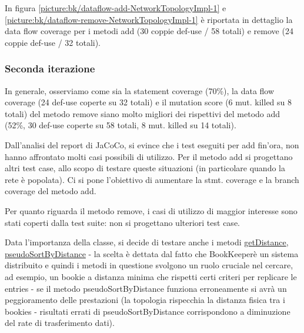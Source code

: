\documentclass[10pt, a4paper]{article}
\newcommand{\getpicturelabel}[1]{picture:#1}
\def\bookkeeper{BookKeeper}
\begin{document}
	In figura \ref{\getpicturelabel{bk/dataflow-add-NetworkTopologyImpl-1}} e 
	\ref{\getpicturelabel{bk/dataflow-remove-NetworkTopologyImpl-1}} 
	è riportata in dettaglio la data flow coverage per i metodi add (30 coppie def-use / 58 totali) e 
	remove (24 coppie def-use / 32 totali).
	
	\subsubsection{Seconda iterazione}
	In generale, osserviamo come sia la statement coverage (70\%), la data flow coverage (24 def-use 
	coperte su 32 totali) e il mutation
	score (6 mut. killed su 8 totali) del metodo remove siano molto migliori dei rispettivi del metodo
	add (52\%, 30 def-use coperte su 58 totali, 8 mut. killed su 14 totali).
	
	Dall'analisi del report di JaCoCo, si evince che i test eseguiti per add fin'ora, non hanno affrontato
	molti casi possibili di utilizzo. Per il metodo add si
	progettano altri test case, allo scopo di testare queste situazioni (in particolare quando la rete è
	popolata). Ci si pone l'obiettivo di aumentare la stmt. coverage e la branch coverage del
	metodo add.
	
	Per quanto riguarda il metodo remove, i casi di utilizzo di maggior interesse 
	sono stati coperti dalla test suite: non si progettano ulteriori test case.
	
	Data l'importanza della classe, si decide di testare anche i metodi 
	\href{https://bookkeeper.apache.org/docs/latest/api/javadoc/org/apache/bookkeeper/net/NetworkTopologyImpl.html#getDistance(org.apache.bookkeeper.net.Node,org.apache.bookkeeper.net.Node)}
	{getDistance},
	\href{https://bookkeeper.apache.org/docs/latest/api/javadoc/org/apache/bookkeeper/net/NetworkTopologyImpl.html#pseudoSortByDistance(org.apache.bookkeeper.net.Node,org.apache.bookkeeper.net.Node[])}
	{pseudoSortByDistance}
	- la scelta è dettata dal fatto che \bookkeeper\;è un sistema distribuito e quindi i metodi in questione svolgono un ruolo cruciale
	nel cercare, ad esempio, un bookie a distanza minima che rispetti certi criteri per replicare le entries - se il metodo pseudoSortByDistance
	funziona erroneamente si avrà un peggioramento delle prestazioni (la topologia rispecchia la distanza fisica tra i bookies - risultati errati di pseudoSortByDistance corrispondono a diminuzione del rate di trasferimento dati).
	
\end{document}
